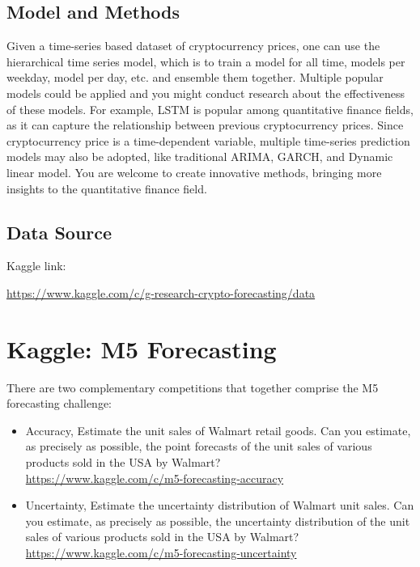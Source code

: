 \documentclass[11pt]{article}
\begin{document}
\subsection{Model and Methods}
Given a time-series based dataset of cryptocurrency prices, one can use the hierarchical time series model, which is to train a model for all time, models per weekday, model per day, etc. and ensemble them together. Multiple popular models could be applied and you might conduct research about the effectiveness of these models. For example, LSTM is popular among quantitative finance fields, as it can capture the relationship between previous cryptocurrency prices. Since cryptocurrency price is a time-dependent variable, multiple time-series prediction models may also be adopted, like traditional ARIMA, GARCH, and Dynamic linear model. You are welcome to create innovative methods, bringing more insights to the quantitative finance field.  
 
\subsection{Data Source}
Kaggle link: 

\url{https://www.kaggle.com/c/g-research-crypto-forecasting/data}


\section{Kaggle: M5 Forecasting}

There are two complementary competitions that together comprise the M5 forecasting challenge: 
\begin{itemize}
\item Accuracy, Estimate the unit sales of Walmart retail goods. Can you estimate, as precisely as possible, the point forecasts of the unit sales of various products sold in the USA by Walmart? \\
\url{https://www.kaggle.com/c/m5-forecasting-accuracy}
\item Uncertainty, Estimate the uncertainty distribution of Walmart unit sales.  Can you estimate, as precisely as possible, the uncertainty distribution of the unit sales of various products sold in the USA by Walmart? \\
\url{https://www.kaggle.com/c/m5-forecasting-uncertainty}
\end{itemize}
\end{document}
